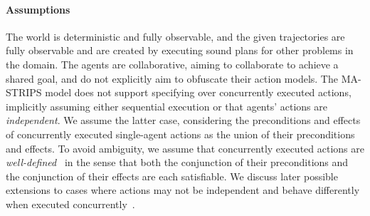 \documentclass[letterpaper]{article} %
\theoremstyle{definition}
\theoremstyle{remark}
\begin{document}
\paragraph{Assumptions}
The world is deterministic and fully observable, and the given trajectories are fully observable and are created by executing sound plans for other problems in the domain.
The agents are collaborative, aiming to collaborate to achieve a shared goal, and do not explicitly aim to obfuscate their action models. %
The MA-STRIPS model does not support specifying over concurrently executed actions, implicitly assuming either sequential execution or that agents' actions are \emph{independent}.
We assume the latter case, considering the preconditions and effects of concurrently executed single-agent actions as the union of their preconditions and effects.
To avoid ambiguity, we assume that concurrently executed actions are \emph{well-defined}~\cite{crosby2014single} in the sense that both the conjunction of their preconditions and the conjunction of their effects are each satisfiable. %
We discuss later possible extensions to cases where actions may not be independent and behave differently when executed concurrently~\cite{boutilier2001partial}.



\end{document}
